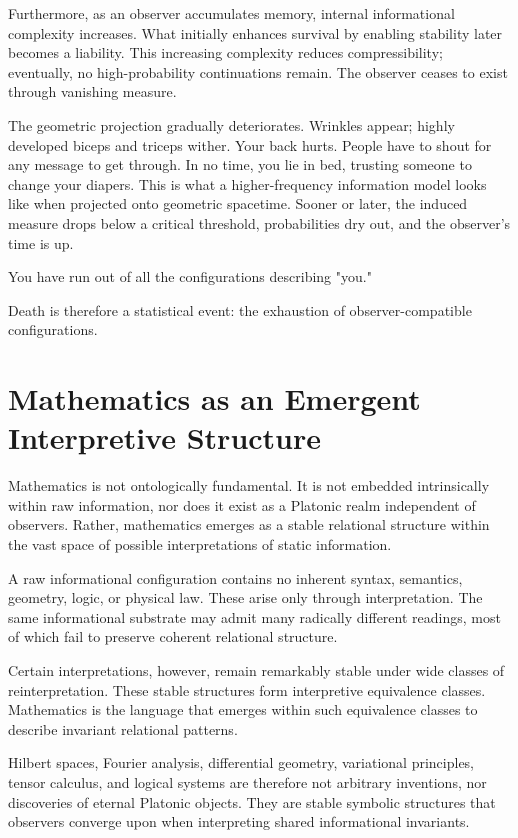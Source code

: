 Furthermore, as an observer accumulates memory, internal informational complexity increases.
What initially enhances survival by enabling stability later becomes a liability.
This increasing complexity reduces compressibility; eventually, no high-probability continuations remain.
The observer ceases to exist through vanishing measure.

The geometric projection gradually deteriorates.
Wrinkles appear; highly developed biceps and triceps wither.
Your back hurts.
People have to shout for any message to get through.
In no time, you lie in bed, trusting someone to change your diapers.
This is what a higher-frequency information model looks like when projected onto geometric spacetime.
Sooner or later, the induced measure drops below a critical threshold, probabilities dry out, and the observer's time is up.

You have run out of all the configurations describing "you."

Death is therefore a statistical event: the exhaustion of observer-compatible configurations.


\section{Mathematics as an Emergent Interpretive Structure}

Mathematics is not ontologically fundamental.
It is not embedded intrinsically within raw information, nor does it exist as a Platonic realm independent of observers.
Rather, mathematics emerges as a stable relational structure within the vast space of possible interpretations of static information.

A raw informational configuration contains no inherent syntax, semantics, geometry, logic, or physical law.
These arise only through interpretation.
The same informational substrate may admit many radically different readings, most of which fail to preserve coherent relational structure.

Certain interpretations, however, remain remarkably stable under wide classes of reinterpretation.
These stable structures form interpretive equivalence classes.
Mathematics is the language that emerges within such equivalence classes to describe invariant relational patterns.

Hilbert spaces, Fourier analysis, differential geometry, variational principles, tensor calculus, and logical systems are therefore not arbitrary inventions, nor discoveries of eternal Platonic objects.
They are stable symbolic structures that observers converge upon when interpreting shared informational invariants.

